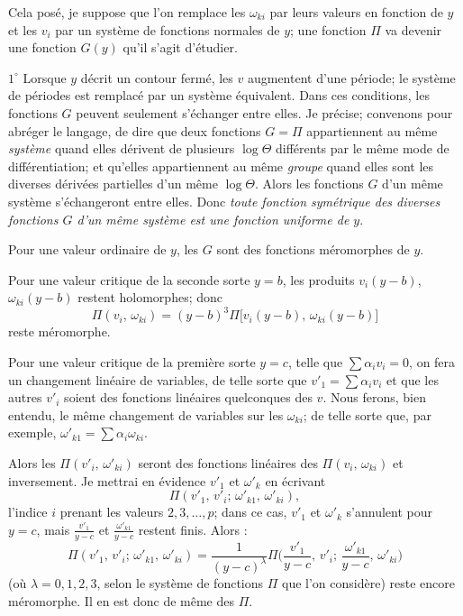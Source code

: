 \documentclass{article}
\begin{document}
Cela posé, je suppose que l'on remplace les $\omega_{ki}$ par leurs valeurs en fonction de $y$ et les $v_{i}$ par un système de fonctions normales de $y$; une fonction $\Pi$ va devenir une fonction $G(y)$ qu'il s'agit d'étudier.

$1^{\circ}$ Lorsque $y$ décrit un contour fermé, les $v$ augmentent d'une période; le système de périodes est remplacé par un système équivalent. Dans ces conditions, les fonctions $G$ peuvent seulement s'échanger entre elles. Je précise; convenons pour abréger le langage, de dire que deux fonctions $G = \Pi$ appartiennent au même \emph{système} quand elles dérivent de plusieurs $\log\Theta$ différents par le même mode de différentiation; et qu'elles appartiennent au même \emph{groupe} quand elles sont les diverses dérivées partielles d'un même $\log\Theta$. Alors les fonctions $G$ d'un même système s'échangeront entre elles. Donc \emph{toute fonction symétrique des diverses fonctions $G$ d'un même système est une fonction uniforme de $y$}.

Pour une valeur ordinaire de $y$, les $G$ sont des fonctions méromorphes de $y$.

Pour une valeur critique de la seconde sorte $y = b$, les produits $v_{i}(y - b)$, $\omega_{ki}(y - b)$ restent holomorphes; donc
\[
\Pi(v_{i},\, \omega_{ki}) = (y - b)^{3} \Pi\bigl[ v_{i}(y - b),\, \omega_{ki}(y - b) \bigr]
\]
reste méromorphe.

Pour une valeur critique de la première sorte $y = c$, telle que $\displaystyle\sum \alpha_{i} v_{i} = 0$, on fera un changement linéaire de variables, de telle sorte que $v'_{1} = \displaystyle\sum \alpha_{i} v_{i}$ et que les autres $v'_{i}$ soient des fonctions linéaires quelconques des $v$. Nous ferons, bien entendu, le même changement de variables sur les $\omega_{ki}$; de telle sorte que, par exemple, $\omega'_{k1} = \displaystyle\sum \alpha_{i} \omega_{ki}$.

Alors les $\Pi(v'_{i},\, \omega'_{ki})$ seront des fonctions linéaires des $\Pi(v_{i},\, \omega_{ki})$ et inversement. Je mettrai en évidence $v'_{1}$ et $\omega'_{k}$ en écrivant
\[
\Pi(v'_{1},\, v'_{i};\, \omega'_{k1},\, \omega'_{ki}),
\]
l'indice $i$ prenant les valeurs $2, 3, \ldots, p$; dans ce cas, $v'_{1}$ et $\omega'_{k}$ s'annulent pour $y = c$, mais $\frac{v'_{1}}{y - c}$ et $\frac{\omega'_{k1}}{y - c}$ restent finis. Alors :
\[
\Pi(v'_{1},\, v'_{i};\, \omega'_{k1},\, \omega'_{ki}) = \frac{1}{(y - c)^{\lambda}} \Pi\biggl( \frac{v'_{1}}{y - c},\, v'_{i};\, \frac{\omega'_{k1}}{y - c},\, \omega'_{ki} \biggr)
\]
(où $\lambda = 0, 1, 2, 3$, selon le système de fonctions $\Pi$ que l'on considère) reste encore méromorphe. Il en est donc de même des $\Pi$.
\end{document}
